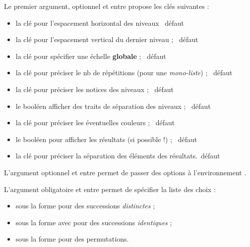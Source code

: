 \begin{cautionblock}
Le premier argument, optionnel et entre \ctex{[...]} propose les clés suivantes :

\begin{itemize}
	\item la clé  pour l'espacement horizontal des niveaux \hfill~défaut 
	\item la clé  pour l'espacement vertical du dernier niveau ; \hfill~défaut 
	\item la clé  pour spécifier une échelle \textbf{globale} ; \hfill~défaut 
	\item la clé  pour préciser le nb de répétitions (pour une \textit{mono-liste}) ; \hfill~défaut 
	\item la clé  pour préciser les notices des niveaux ; \hfill~défaut 
	\item le booléen  afficher des traits de séparation des niveaux ; \hfill~défaut 
	\item la clé  pour préciser les éventuelles couleurs ; \hfill~défaut 
	\item le booléen  pour afficher les résultats (si possible !) ; \hfill~défaut 
	\item la clé  pour préciser la séparation des éléments des résultats.\hfill~défaut 
\end{itemize}

L'argument optionnel et entre  permet de passer des options à l'environnement .

\smallskip

L'argument obligatoire et entre  permet de spécifier la liste des choix :

\begin{itemize}
	\item sous la forme  pour des successions \textit{distinctes} ;
	\item sous la forme  avec  pour des successions \textit{identiques} ;
	\item sous la forme  pour des permutations.
\end{itemize}
\vspace*{-\baselineskip}\leavevmode
\end{cautionblock}

